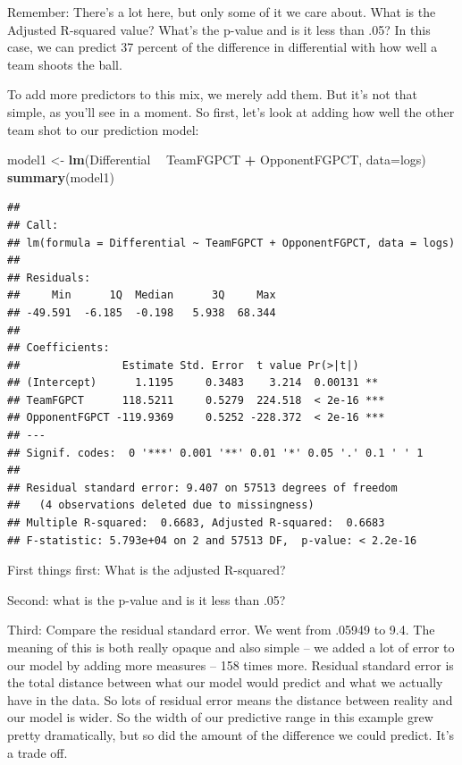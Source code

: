 \documentclass[]{book}
\newenvironment{Shaded}{\begin{snugshade}}{\end{snugshade}}
\newcommand{\DataTypeTok}[1]{\textcolor[rgb]{0.13,0.29,0.53}{#1}}
\newcommand{\KeywordTok}[1]{\textcolor[rgb]{0.13,0.29,0.53}{\textbf{#1}}}
\newcommand{\NormalTok}[1]{#1}
\newcommand{\OperatorTok}[1]{\textcolor[rgb]{0.81,0.36,0.00}{\textbf{#1}}}
\newcommand{\StringTok}[1]{\textcolor[rgb]{0.31,0.60,0.02}{#1}}
\begin{document}
Remember: There's a lot here, but only some of it we care about. What is the Adjusted R-squared value? What's the p-value and is it less than .05? In this case, we can predict 37 percent of the difference in differential with how well a team shoots the ball.

To add more predictors to this mix, we merely add them. But it's not that simple, as you'll see in a moment. So first, let's look at adding how well the other team shot to our prediction model:

\begin{Shaded}
\begin{Highlighting}[]
\NormalTok{model1 <-}\StringTok{ }\KeywordTok{lm}\NormalTok{(Differential }\OperatorTok{~}\StringTok{ }\NormalTok{TeamFGPCT }\OperatorTok{+}\StringTok{ }\NormalTok{OpponentFGPCT, }\DataTypeTok{data=}\NormalTok{logs)}
\KeywordTok{summary}\NormalTok{(model1)}
\end{Highlighting}
\end{Shaded}

\begin{verbatim}
## 
## Call:
## lm(formula = Differential ~ TeamFGPCT + OpponentFGPCT, data = logs)
## 
## Residuals:
##     Min      1Q  Median      3Q     Max 
## -49.591  -6.185  -0.198   5.938  68.344 
## 
## Coefficients:
##                Estimate Std. Error  t value Pr(>|t|)    
## (Intercept)      1.1195     0.3483    3.214  0.00131 ** 
## TeamFGPCT      118.5211     0.5279  224.518  < 2e-16 ***
## OpponentFGPCT -119.9369     0.5252 -228.372  < 2e-16 ***
## ---
## Signif. codes:  0 '***' 0.001 '**' 0.01 '*' 0.05 '.' 0.1 ' ' 1
## 
## Residual standard error: 9.407 on 57513 degrees of freedom
##   (4 observations deleted due to missingness)
## Multiple R-squared:  0.6683, Adjusted R-squared:  0.6683 
## F-statistic: 5.793e+04 on 2 and 57513 DF,  p-value: < 2.2e-16
\end{verbatim}

First things first: What is the adjusted R-squared?

Second: what is the p-value and is it less than .05?

Third: Compare the residual standard error. We went from .05949 to 9.4. The meaning of this is both really opaque and also simple -- we added a lot of error to our model by adding more measures -- 158 times more. Residual standard error is the total distance between what our model would predict and what we actually have in the data. So lots of residual error means the distance between reality and our model is wider. So the width of our predictive range in this example grew pretty dramatically, but so did the amount of the difference we could predict. It's a trade off.
\end{document}

